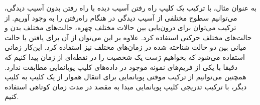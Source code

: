 به عنوان مثال، با ترکیب یک کلیپ راه رفتن آسیب دیده با راه رفتن بدون آسیب دیدگی، می‌توانیم سطوح مختلفی از آسیب دیدگی در هنگام راه‌رفتن را به وجود آوریم.
از ترکیب می‌توان برای درون‌یابی بین حالات مختلف چهره، حالت‌های مختلف بدن و حالت‌های مختلف حرکتی استفاده کرد.
علاوه بر این می‌توان از آن برای یافتن یا حالت میانی بین دو حالت شناخته شده در زمان‌های مختلف نیز استفاده کرد. این‌کار زمانی استفاده می‌شود که بخواهیم ژست یک شخصیت را در نقطه‌ای از زمان پیدا کنیم که دقیقا با یکی از فریم‌های نمونه موجود در داده‌های کلیپ پویانمایی مطابقت ندارد.
همچنین می‌توانیم از ترکیب موقتی پویانمایی برای انتقال هموار از یک کلیپ به کلیپ دیگر، با ترکیب تدریجی کلیپ پویانمایی مبدا به مقصد در مدت زمان کوتاهی استفاده کنیم.